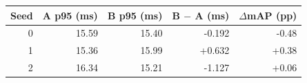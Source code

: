 \begin{tabular}{rrrrr}
\hline
Seed & A p95 (ms) & B p95 (ms) & B $-$ A (ms) & $\Delta$mAP (pp) \\
\hline
0 & 15.59 & 15.40 & -0.192 & -0.48 \\
1 & 15.36 & 15.99 & +0.632 & +0.38 \\
2 & 16.34 & 15.21 & -1.127 & +0.06 \\
\hline
\end{tabular}
